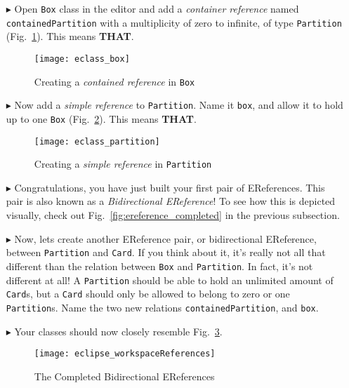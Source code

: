 \begin{itemize}

\item[$\blacktriangleright$] Open \texttt{Box} class in the editor and add a \emph{container reference} named \texttt{containedPartition} with a multiplicity of zero
to infinite, of type \texttt{Partition} (Fig.~\ref{fig:cpartitionReference}). This means {\bf THAT}.

\begin{figure}[htbp]
	\centering
  \texttt{[image: eclass\_box]}
	\caption{Creating a \emph{contained reference} in \texttt{Box}}
	\label{fig:cpartitionReference}
\end{figure} 

\item[$\blacktriangleright$] Now add a \emph{simple reference} to \texttt{Partition}. Name it \texttt{box}, and allow it to hold up to one \texttt{Box}
(Fig.~\ref{fig:boxReference}). This means {\bf THAT}.

\begin{figure}[htbp]
	\centering
  \texttt{[image: eclass\_partition]}
	\caption{Creating a \emph{simple reference} in \texttt{Partition}}
	\label{fig:boxReference}
\end{figure} 

\item[$\blacktriangleright$] Congratulations, you have just built your first pair of EReferences. This pair is also known as a \emph{Bidirectional
EReference}! To see how this is depicted visually, check out Fig.~\ref{fig:ereference_completed} in the previous subsection.

\newpage

\item[$\blacktriangleright$] Now, lets create another EReference pair, or bidirectional EReference, between \texttt{Partition} and \texttt{Card}. If you think
about it, it's really not all that different than the relation between \texttt{Box} and \texttt{Partition}. In fact, it's not different at all! A
\texttt{Partition} should be able to hold an unlimited amount of \texttt{Card}s, but a \texttt{Card} should only be allowed to belong to zero or one
\texttt{Partition}s. Name the two new relations \texttt{containedPartition}, and \texttt{box}.

\item[$\blacktriangleright$] Your classes should now closely resemble Fig.~\ref{fig:almostAllReferences}.

\begin{figure}[htbp]
	\centering
  \texttt{[image: eclipse\_workspaceReferences]}
	\caption{The Completed Bidirectional EReferences}
	\label{fig:almostAllReferences}
\end{figure} 


\end{itemize}
